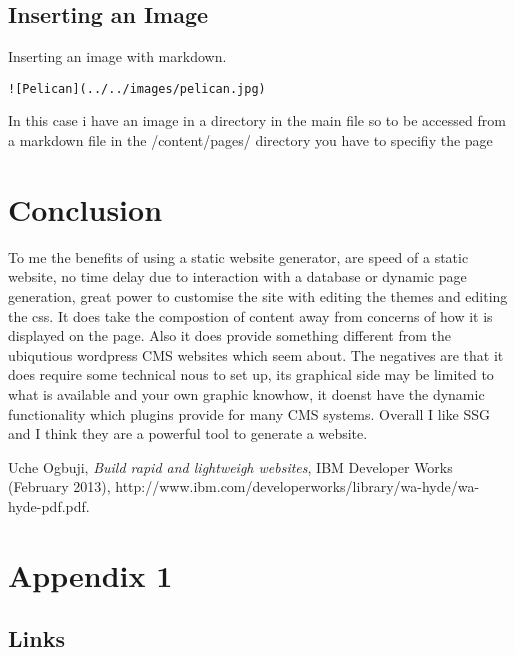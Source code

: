 \documentclass[12pt]{article}			%
\begin{document}
\subsection{Inserting an Image}
Inserting an image with markdown.
\begin{verbatim}
![Pelican](../../images/pelican.jpg)
\end{verbatim}
In this case i have an image in a directory in the main file so to be accessed from a markdown file in the /content/pages/ directory you have to specifiy the page


\newpage
\section{Conclusion}
To me the benefits of using a static website generator, are speed of a static website,
no time delay due to interaction with a database or dynamic page generation, great power to customise the site with editing the themes and editing the css. It does take the compostion of content away from concerns of how it is displayed on the page.
Also it does provide something different from the ubiqutious wordpress CMS websites which seem about.
The negatives are that it does require some technical nous to set up, its graphical side may be limited to what is available and your own graphic knowhow, it doenst have the dynamic functionality which plugins provide for many CMS systems.
Overall I like SSG and I think they are a powerful tool to generate a website.


\newpage
\begin{thebibliography}{9}

 Uche Ogbuji, \emph{Build rapid and lightweigh websites}, IBM Developer Works (February 2013), http://www.ibm.com/developerworks/library/wa-hyde/wa-hyde-pdf.pdf.  
\end{thebibliography}



\newpage
\appendix
\section{Appendix 1}
\subsection{Links}
\end{document}
